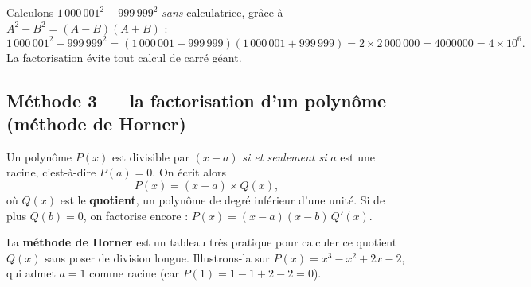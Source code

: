 \documentclass[11pt,a4paper]{article}
\begin{document}
\begin{exemple}
Calculons $1\,000\,001^{2}-999\,999^{2}$ \emph{sans} calculatrice, grâce à $A^2-B^2=(A-B)(A+B)$ :
\[ 1\,000\,001^{2}-999\,999^{2}=(1\,000\,001-999\,999)(1\,000\,001+999\,999)=2\times 2\,000\,000=\num{4000000}=4\times 10^{6}. \]
La factorisation évite tout calcul de carré géant.
\end{exemple}

\subsection{Méthode 3 — la factorisation d'un polynôme (méthode de Horner)}

\begin{theoreme}
Un polynôme $P(x)$ est divisible par $(x-a)$ \emph{si et seulement si} $a$ est une racine, c'est-à-dire
$P(a)=0$. On écrit alors
\[ P(x)=(x-a)\times Q(x), \]
où $Q(x)$ est le \textbf{quotient}, un polynôme de degré inférieur d'une unité. Si de plus $Q(b)=0$,
on factorise encore : $P(x)=(x-a)(x-b)\,Q'(x)$.
\end{theoreme}

\noindent La \textbf{méthode de Horner} est un tableau très pratique pour calculer ce quotient $Q(x)$
sans poser de division longue. Illustrons-la sur $P(x)=x^{3}-x^{2}+2x-2$, qui admet $a=1$ comme racine
(car $P(1)=1-1+2-2=0$).
\end{document}
